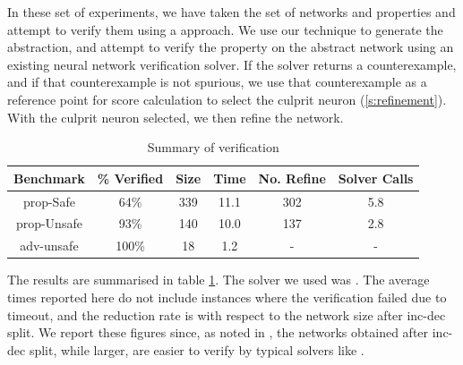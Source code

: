 

In these set of experiments, we have taken the \acasxu set of
networks  and
properties and attempt to verify them using a \cegar approach. We use our
technique to generate the abstraction, and attempt to verify the property on the
abstract network using an existing neural network verification solver. If the
solver returns a counterexample, and if that counterexample is not spurious, we
use that counterexample as a reference point for score calculation  to select
the culprit neuron (\ref{s:refinement}). With the culprit neuron selected, we
then refine the network.

\begin{table}
\footnotesize
\begin{tabular}{ |c|c|c|c|c|c| }
\hline
Benchmark   & \% Verified & Size     & Time    & No. Refine & Solver Calls \\ 
\hline
prop-Safe   &   64\%      & 339      & 11.1    & 302        & 5.8      \\
prop-Unsafe &   93\%      & 140      & 10.0    & 137        & 2.8      \\
adv-unsafe  &  100\%      & 18       & 1.2     & -          & -        \\
\hline                                                                
\end{tabular}
\caption{Summary of \acasxu verification }
\label{t:acas-summary}
\end{table}

The results are summarised in table \ref{t:acas-summary}. The solver we used was
\abcrown. The average times reported here do not include instances where the
verification failed due to timeout, and the reduction rate is with respect to
the network size after inc-dec split. We report these figures since, as noted in
\cite{cegar-nn}, the networks obtained after inc-dec split, while larger, are
easier to verify by typical solvers like \marabou.

